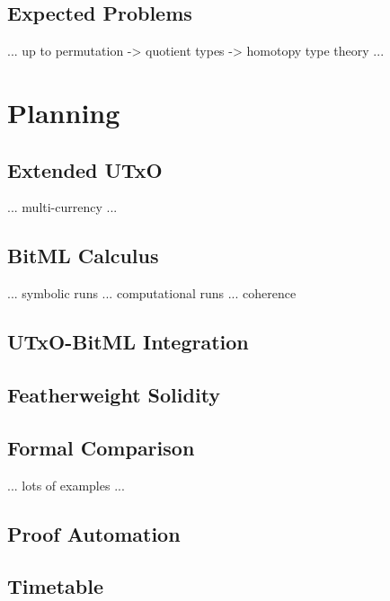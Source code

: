 \documentclass[acmsmall,nonacm=true,screen=true]{acmart}\settopmatter{printfolios=false,printccs=false,printacmref=false}
\begin{document}
\subsection{Expected Problems}
... up to permutation -> quotient types -> homotopy type theory ...

\section{Planning}
\label{sec:plan}

\subsection{Extended UTxO}
... multi-currency ... 

\subsection{BitML Calculus}
... symbolic runs ... computational runs ... coherence

\subsection{UTxO-BitML Integration}

\subsection{Featherweight Solidity}

\subsection{Formal Comparison}
... lots of examples ...

\subsection{Proof Automation}

\subsection{Timetable}
\end{document}
